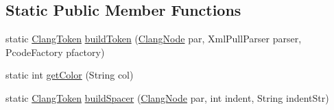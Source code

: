 \subsection*{Static Public Member Functions}
\begin{DoxyCompactItemize}
\item 
static \mbox{\hyperlink{classghidra_1_1app_1_1decompiler_1_1_clang_token}{Clang\+Token}} \mbox{\hyperlink{classghidra_1_1app_1_1decompiler_1_1_clang_token_a4d678725186dfa338226cce1d16417f5}{build\+Token}} (\mbox{\hyperlink{interfaceghidra_1_1app_1_1decompiler_1_1_clang_node}{Clang\+Node}} par, Xml\+Pull\+Parser parser, Pcode\+Factory pfactory)
\item 
static int \mbox{\hyperlink{classghidra_1_1app_1_1decompiler_1_1_clang_token_aacea75ea4da0a1ed20b8034c5805b8d4}{get\+Color}} (String col)
\item 
static \mbox{\hyperlink{classghidra_1_1app_1_1decompiler_1_1_clang_token}{Clang\+Token}} \mbox{\hyperlink{classghidra_1_1app_1_1decompiler_1_1_clang_token_abf895f740274c7d525f0aacb1fe1a3ed}{build\+Spacer}} (\mbox{\hyperlink{interfaceghidra_1_1app_1_1decompiler_1_1_clang_node}{Clang\+Node}} par, int indent, String indent\+Str)
\end{DoxyCompactItemize}
